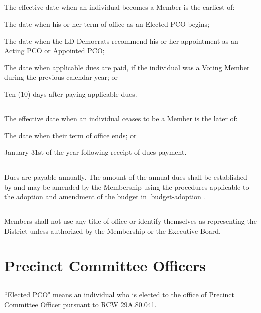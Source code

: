 \subsection{}
The effective date when an individual becomes a Member is the earliest of:
\begin{alphalist}
    \item The date when his or her term of office as an Elected PCO begins;
    \item The date when the \fortythird{} LD Democrats recommend his or her appointment as an Acting PCO or
Appointed PCO;
    \item The date when applicable dues are paid, if the individual was a Voting Member during the previous
calendar year; or
    \item Ten (10) days after paying applicable dues.
\end{alphalist}

\subsection{}
The effective date when an individual ceases to be a Member is the later of:
\begin{alphalist}
    \item The date when their term of office ends; or
    \item January 31st of the year following receipt of dues payment.
\end{alphalist}

\subsection{}
Dues are payable annually. The amount of the annual dues shall be established by and may be amended by the Membership using the procedures applicable to the adoption and amendment of the budget in \autoref{budget-adoption}.

\subsection{}
Members shall not use any title of office or identify themselves as representing the \fortythird{} District unless authorized by the Membership or the Executive Board.

\section{Precinct Committee Officers}
\subsection{} \label{elected-pco}
``Elected PCO" means an individual who is elected to the office of Precinct Committee Officer pursuant to RCW 29A.80.041.

